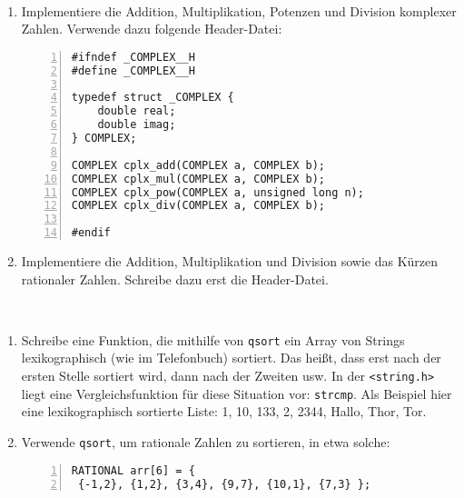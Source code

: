 \documentclass{uebungszettel}
\begin{document}
\begin{aufg}
~\begin{enumerate}
\item Implementiere die Addition, Multiplikation, Potenzen und Division komplexer Zahlen. Verwende dazu folgende Header-Datei:
\begin{codelisting}
\begin{lstlisting}[numbers=left,numberstyle=\tiny,frame=tlrb]
#ifndef _COMPLEX__H
#define _COMPLEX__H

typedef struct _COMPLEX {
	double real;
	double imag;
} COMPLEX;

COMPLEX cplx_add(COMPLEX a, COMPLEX b);
COMPLEX cplx_mul(COMPLEX a, COMPLEX b);
COMPLEX cplx_pow(COMPLEX a, unsigned long n);
COMPLEX cplx_div(COMPLEX a, COMPLEX b);

#endif
\end{lstlisting}
\end{codelisting}
\item Implementiere die Addition, Multiplikation und Division sowie das Kürzen rationaler Zahlen. Schreibe dazu erst die Header-Datei.
\end{enumerate}
\end{aufg}

\begin{aufg}
~\begin{enumerate}
\item Schreibe eine Funktion, die mithilfe von \verb|qsort| ein Array von Strings lexikographisch (wie im Telefonbuch) sortiert. Das heißt, dass erst nach der ersten Stelle sortiert wird, dann nach der Zweiten usw. In der \verb|<string.h>| liegt eine Vergleichsfunktion für diese Situation vor: \verb|strcmp|. Als Beispiel hier eine lexikographisch sortierte Liste: 1, 10, 133, 2, 2344, Hallo, Thor, Tor.
\item Verwende \verb|qsort|, um rationale Zahlen zu sortieren, in etwa solche:
\begin{codelisting}
\begin{lstlisting}[numbers=left,numberstyle=\tiny,frame=tlrb]
RATIONAL arr[6] = { 
 {-1,2}, {1,2}, {3,4}, {9,7}, {10,1}, {7,3} };
\end{lstlisting}
\end{codelisting}
\end{enumerate}
\end{aufg}
\end{document}
